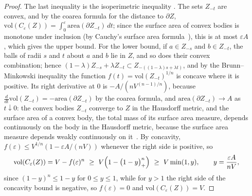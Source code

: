\documentclass[11pt]{amsart}
\theoremstyle{definition}
\theoremstyle{remark}
\begin{document}
\begin{proof}
The last inequality is the isoperimetric inequality \cite[(7.20)]{Sch14}. The sets $Z_{-t}$ are convex, and by the coarea formula \cite[3.2.11]{Fed69} for the distance to $\partial Z$, $\mathrm{vol}(C_\varepsilon(Z))=\int_0^\varepsilon\mathrm{area}(\partial Z_{-t})\,dt$; since the surface area of convex bodies is monotone under inclusion (by Cauchy's surface area formula~\cite[(5.73)]{Sch14}), this is at most $\varepsilon A$, which gives the upper bound. For the lower bound, if $a\in Z_{-s}$ and $b\in Z_{-t}$, the balls of radii $s$ and $t$ about $a$ and $b$ lie in $Z$, and so does their convex combination; hence $(1-\lambda)Z_{-s}+\lambda Z_{-t}\subset Z_{-((1-\lambda)s+\lambda t)}$, and by the Brunn--Minkowski inequality \cite[Thm.~7.1.1]{Sch14} the function $f(t)=\mathrm{vol}(Z_{-t})^{1/n}$ is concave where it is positive. Its right derivative at $0$ is $-A/(nV^{(n-1)/n})$, because $\frac d{dt}\mathrm{vol}(Z_{-t})=-\mathrm{area}(\partial Z_{-t})$ by the coarea formula, and $\mathrm{area}(\partial Z_{-t})\to A$ as $t\downarrow0$: the convex bodies $Z_{-t}$ converge to $Z$ in the Hausdorff metric, and the surface area of a convex body, the total mass of its surface area measure, depends continuously on the body in the Hausdorff metric, because the surface area measure depends weakly continuously on it~\cite[\S4.2]{Sch14}. By concavity, $f(\varepsilon)\le V^{1/n}(1-\varepsilon A/(nV))$ whenever the right side is positive, so
\[
  \mathrm{vol}(C_\varepsilon(Z))=V-f(\varepsilon)^n\ \ge\ V\Bigl(1-\bigl(1-y\bigr)_+^n\Bigr)\ \ge\ V\min(1,y),\qquad y=\frac{\varepsilon A}{nV},
\]
since $(1-y)^n\le1-y$ for $0\le y\le1$, while for $y>1$ the right side of the concavity bound is negative, so $f(\varepsilon)=0$ and $\mathrm{vol}(C_\varepsilon(Z))=V$.
\end{proof}

\thmcutout*
\end{document}
